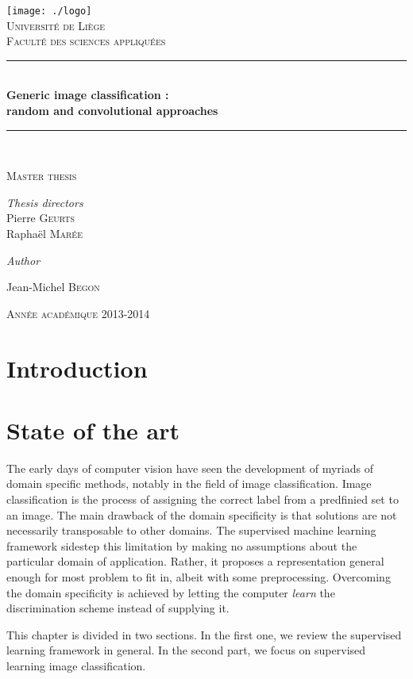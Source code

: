 \documentclass[a4paper]{report}
\newlength{\larg}
\newcommand{\titleg}{
  \begin{titlepage}
  \begin{center}

  \bigskip
  \bigskip
  \bigskip
  \bigskip 
  \bigskip


  \texttt{[image: ./logo]}\\[1cm]
  \smallskip
  \textsc{\LARGE Université de Liège}\\
  \smallskip
  \textsc{Faculté des sciences appliquées}\\

  \bigskip



  \rule{\columnwidth}{1pt} \\[0.4cm] 
  { \huge \bfseries Generic image classification : \\ \bigskip random and convolutional approaches}\\[0.4cm]
  \rule{\columnwidth}{1pt} \\[0.2cm]



  \begin{minipage}{0.7\textwidth} 
  \begin{center} \large 
  \textsc{Master thesis}
  \end{center} \end{minipage}

  \vfill


  \begin{minipage}{0.7\textwidth} \begin{center}
  \textit{Thesis directors} \\
  \large Pierre \textsc{Geurts} \\
  \large Raphaël \textsc{Marée} 
  \end{center} \end{minipage} 

  \bigskip
  \bigskip
  \bigskip

  \textit{Author} \\
  \begin{minipage}{0.7\textwidth} \begin{center}
  \large Jean-Michel \textsc{Begon}
  \end{center} \end{minipage} 
  


  \bigskip
  \bigskip
  \bigskip

  \textsc{Année académique 2013-2014}
  \end{center}
  \end{titlepage}
}
\begin{document}
\titleg
\thispagestyle{empty}
\newpage

\pagestyle{fancy}
\lhead{}
\chead{}
\rhead{\itshape \textcolor{gris}{\rightmark}} %
\lfoot{\itshape \textcolor{gris}{Generic image classification - The RandConv framework}}
\cfoot{}
\rfoot{\itshape \textcolor{gris}{\thepage}}
\renewcommand{\headrulewidth}{0.4pt}
\renewcommand{\footrulewidth}{0.4pt}

\newpage 


\tableofcontents

\chapter{Introduction}

\chapter{State of the art}
The early days of computer vision have seen the development of myriads of domain specific methods, notably in the field of image classification. Image classification is the process of assigning the correct label from a predfinied set to an image. The main drawback of the domain specificity is that solutions are not necessarily transposable to other domains. The supervised machine learning framework sidestep this limitation by making no assumptions about the particular domain of application. Rather, it proposes a representation general enough for most problem to fit in, albeit with some preprocessing. Overcoming the domain specificity is achieved by letting the computer \textit{learn} the discrimination scheme instead of supplying it.
\par
This chapter is divided in two sections. In the first one, we review the supervised learning framework in general. In the second part, we focus on supervised learning image classification.
\end{document}
